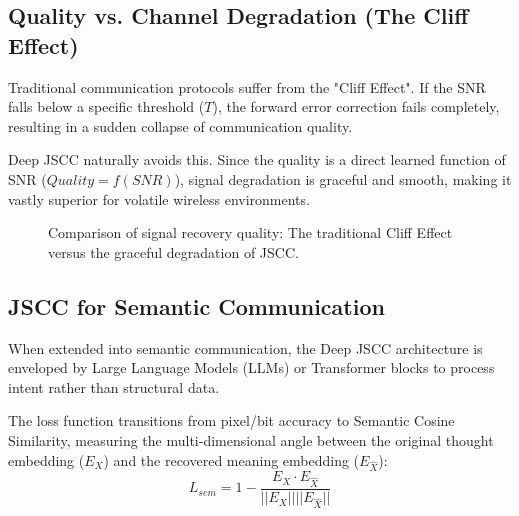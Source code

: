 \documentclass[10pt, conference]{IEEEtran}
\begin{document}
\subsection{\textbf{Quality vs. Channel Degradation (The Cliff Effect)}}
Traditional communication protocols suffer from the "Cliff Effect". If the SNR falls below a specific threshold ($T$), the forward error correction fails completely, resulting in a sudden collapse of communication quality. 

Deep JSCC naturally avoids this. Since the quality is a direct learned function of SNR ($Quality = f(SNR)$), signal degradation is graceful and smooth, making it vastly superior for volatile wireless environments.

\begin{figure}[h]
\centering
{}
\caption{Comparison of signal recovery quality: The traditional Cliff Effect versus the graceful degradation of JSCC.}
\label{fig:cliff_effect}
\end{figure}

\subsection{\textbf{JSCC for Semantic Communication}}
When extended into semantic communication, the Deep JSCC architecture is enveloped by Large Language Models (LLMs) or Transformer blocks to process intent rather than structural data. 

The loss function transitions from pixel/bit accuracy to Semantic Cosine Similarity, measuring the multi-dimensional angle between the original thought embedding ($E_X$) and the recovered meaning embedding ($E_{\hat{X}}$):
\begin{equation}
    L_{sem} = 1 - \frac{E_X \cdot E_{\hat{X}}}{||E_X|| ||E_{\hat{X}}||}
\end{equation}
\end{document}
